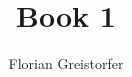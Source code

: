 \documentclass[
twoside=true,														%
openany
]{scrbook}
\title{Book 1}
\author{Florian Greistorfer}
\date{}
\begin{document}
\frontmatter
\maketitle
\clearscrheadfoot


\mainmatter
\ofoot[\pagemark]{\pagemark}
\tableofcontents
{}
\newcommand{\kapitel}[1][]{
\stepcounter{chapters}
\chapter*{\arabic{chapters}. Kapitel #1}
\addcontentsline{toc}{chapter}{\arabic{chapters}. Kapitel #1}
\markboth{}{}
}


\end{document}
